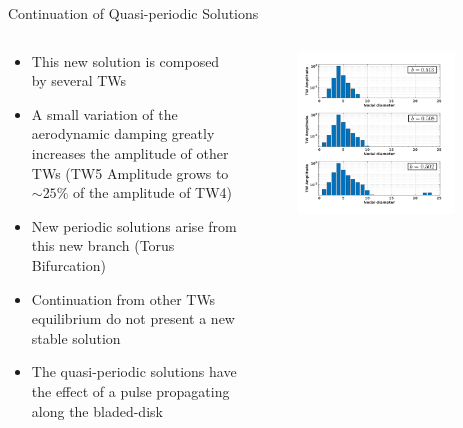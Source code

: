 \documentclass[dvipsnames, aspectratio = 169]{beamer}
\begin{document}
\begin{frame}{Continuation of Quasi-periodic Solutions}
	\begin{columns}
		\begin{column}{0.5\textwidth}
			\begin{itemize}
				\item This new solution is composed by several TWs
				\item A small variation of the aerodynamic damping greatly increases the amplitude of other TWs (TW5 Amplitude grows to $ \sim 25\% $ of the amplitude of TW4)
				\item New periodic solutions arise from this new branch (Torus Bifurcation)
				\item Continuation from other TWs equilibrium do not present a new stable solution
				\item The quasi-periodic solutions have the effect of a pulse propagating along the bladed-disk
			\end{itemize}
		\end{column}

		\begin{column}{0.45\textwidth}
			\begin{figure}[h!]
				\centering
				\includegraphics[width = 0.9\textwidth]{TW_amplitudes_multiwave.png}
				\label{fig:Multi-wave_amplitudes}
			\end{figure}
		\end{column}

	\end{columns}
\end{frame}
\end{document}
